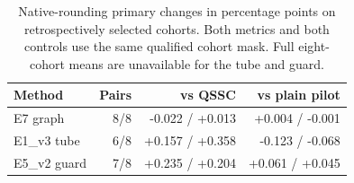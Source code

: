 \begin{table}[ht]
\centering\small
\caption{Native-rounding primary changes in percentage points on retrospectively selected cohorts. Both metrics and both controls use the same qualified cohort mask. Full eight-cohort means are unavailable for the tube and guard.}
\label{tab:edge-deletion}
\begin{tabular}{lrrr}\toprule
Method & Pairs & vs QSSC & vs plain pilot\\\midrule
E7 graph & 8/8 & -0.022 / +0.013 & +0.004 / -0.001\\
E1\_v3 tube & 6/8 & +0.157 / +0.358 & -0.123 / -0.068\\
E5\_v2 guard & 7/8 & +0.235 / +0.204 & +0.061 / +0.045\\
\bottomrule\end{tabular}
\end{table}
